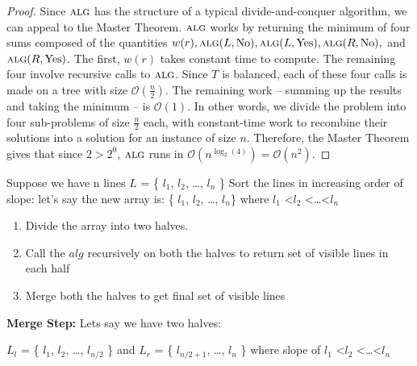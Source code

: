 \documentclass[11pt]{article}
\renewcommand{\O}{\mathcal{O}}
\newcommand{\alg}{\textsc{alg}}
\begin{document}
\begin{proof}
  Since $\alg$ has the structure of a typical divide-and-conquer algorithm, we can appeal to the Master Theorem.
  $\alg$ works by returning the minimum of four sums composed of the quantities $w(r), \alg(L, \operatorname{No}), \alg(L, \operatorname{Yes}), \alg(R, \operatorname{No}),$ and $\alg(R, \operatorname{Yes})$.
  The first, $w(r)$ takes constant time to compute.
  The remaining four involve recursive calls to $\alg$.
  Since $T$ is balanced, each of these four calls is made on a tree with size $\O(\frac{n}{2})$.
  The remaining work -- summing up the results and taking the minimum -- is $\O(1)$.
  In other words, we divide the problem into four sub-problems of size $\frac{n}{2}$ each, with constant-time work to recombine their solutions into a solution for an instance of size $n$.
  Therefore, the Master Theorem gives that since $2 > 2^0$, $\alg$ runs in $\O(n^{\log_{2}(4)}) = \O(n^2)$.
\end{proof}


Suppose we have n lines $L$ = \{ $l_1$, $l_2$, \dots, $l_n$ \} \newline
Sort the lines in increasing order of slope: \newline
let's say the new array is: \{ $l_1$, $l_2$, \dots , $l_n$\} where $l_1$ \textless $l_2$ \textless \dots \textless $l_n$ \newline
\begin{enumerate}
\item Divide the array into two halves. \newline
\item Call the $alg$ recursively on both the halves to return set of visible lines in each half \newline
\item Merge both the halves to get final set of visible lines \newline
\end{enumerate}
{\bf Merge Step:} \newline
Lets say we have two halves: \newline

$L_l$ = \{ $l_1$, $l_2$, \dots, $l_{n/2}$ \}  and $L_r$ = \{ $l_{n/2+1}$, \dots, $l_n$ \}  \newline
where slope of $l_1$ \textless $l_2$ \textless \dots \textless $l_n$
\end{document}
